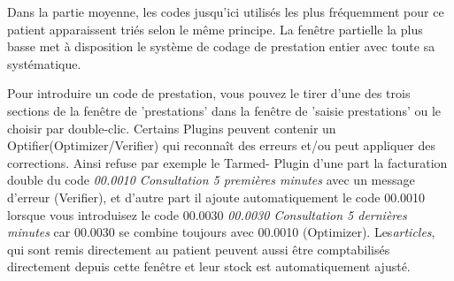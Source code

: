 \medskip
Dans la partie moyenne, les codes jusqu'ici utilisés les plus fréquemment pour ce patient apparaissent triés selon
le même principe. La fenêtre partielle la plus basse met à disposition le système de codage de prestation entier
avec toute sa systématique.


\bigskip

Pour introduire un code de prestation, vous pouvez le tirer d'une des trois sections de la fenêtre de 'prestations' dans la fenêtre de 'saisie prestations' ou le choisir par double-clic.
Certains Plugins peuvent contenir un  \glqq Optifier\grqq (Optimizer/Verifier) qui reconnaît des erreurs et/ou peut appliquer des corrections. Ainsi refuse par exemple le Tarmed- Plugin d'une part la facturation double du code \textit{00.0010 Consultation 5 premières minutes } avec un message d'erreur  (Verifier), et d'autre part il ajoute automatiquement le code 00.0010 lorsque vous introduisez le code 00.0030 \textit{00.0030 Consultation 5 dernières minutes} car 00.0030 se combine toujours avec 00.0010 (Optimizer).
Les\textit{articles}, qui sont remis directement au patient peuvent aussi être comptabilisés directement depuis cette fenêtre et leur stock est automatiquement ajusté.

